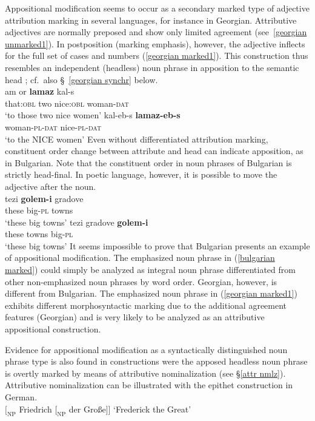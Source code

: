 Appositional modification seems to occur as a secondary marked type of adjective attribution marking in several languages, for instance in Georgian. Attributive adjectives are normally preposed and show only limited agreement (see~\ref{georgian unmarked1}). In postposition (marking emphasis), however, the adjective inflects for the full set of cases and numbers (\ref{georgian marked1}). This construction thus resembles an independent (headless) noun phrase in apposition to the semantic head \citep[652, 677]{testelec1998}; cf.~also \S~\ref{georgian synchr} below.
\ea
{}\\
\ea \label{georgian unmarked1}
\gll	am or \textbf{lamaz} kal-s\\
	that:\textsc{obl} two nice:\textsc{obl} woman-\textsc{dat}\\
\glt	‘to those two nice women’
\ex \label{georgian marked1}
\gll	kal-eb-s \textbf{lamaz-eb-s}\\
	woman-\textsc{pl}-\textsc{dat} nice-\textsc{pl}-\textsc{dat}\\
\glt	‘to the NICE women’
\z
\z
Even without differentiated attribution marking, constituent order change between attribute and head can indicate apposition, as in Bulgarian. Note that the constituent order in noun phrases of Bulgarian is strictly head-final. In poetic language, however, it is possible to move the adjective after the noun.
\ea
{}\\
\ea
\gll	tezi \textbf{golem-i} gradove\\
	these big-\textsc{pl} towns\\
\glt	‘these big towns’
\ex	\label{bulgarian marked}
\gll	tezi gradove \textbf{golem-i}\\
	these towns big-\textsc{pl}\\
\glt	‘these big towns’
\z
\z
It seems impossible to prove that Bulgarian presents an example of appositional modification. The emphasized noun phrase in (\ref{bulgarian marked}) could simply be analyzed as integral noun phrase differentiated from other non-emphasized noun phrases by word order. Georgian, however, is different from Bulgarian. The emphasized noun phrase in (\ref{georgian marked1}) exhibits different morphosyntactic marking due to the additional agreement features (Georgian) and is very likely to be analyzed as an attributive appositional construction.

Evidence for appositional modification as a syntactically distinguished noun phrase type is also found in constructions were the apposed headless noun phrase is overtly marked by means of attributive nominalization (see \S \ref{attr nmlz}). Attributive nominalization can be illustrated with the epithet construction in German.
\ea 
{}\\
$[_\textrm{NP}$ Friedrich $[_\textrm{NP}$ der Gro{ß}e$] ]$ \textrm{‘Frederick the Great’}
\z
{}
